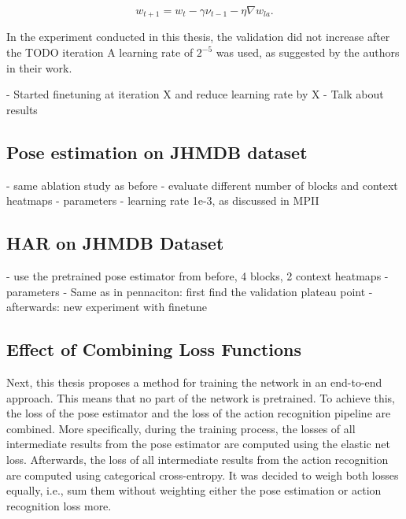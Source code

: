 \begin{equation}
    w_{t+1} = w_t - \gamma \nu_{t-1} - \eta \nabla w_{la}.
\end{equation}

In the experiment conducted in this thesis, the validation did not increase after the TODO iteration
A learning rate of $2^{-5}$ was used, as suggested by the authors in their work.

- Started finetuning at iteration X and reduce learning rate by X %
- Talk about results

\subsection{Pose estimation on JHMDB dataset}

- same ablation study as before
    - evaluate different number of blocks and context heatmaps
- parameters
    - learning rate 1e-3, as discussed in MPII



\subsection{HAR on JHMDB Dataset}
- use the pretrained pose estimator from before, 4 blocks, 2 context heatmaps
- parameters
- Same as in pennaciton: first find the validation plateau point
- afterwards: new experiment with finetune

\subsection{Effect of Combining Loss Functions}
Next, this thesis proposes a method for training the network in an end-to-end approach.
This means that no part of the network is pretrained.
To achieve this, the loss of the pose estimator and the loss of the action recognition pipeline are combined.
More specifically, during the training process, the losses of all intermediate results from the pose estimator are computed using the elastic net loss.
Afterwards, the loss of all intermediate results from the action recognition are computed using categorical cross-entropy.
It was decided to weigh both losses equally, i.e., sum them without weighting either the pose estimation or action recognition loss more.

